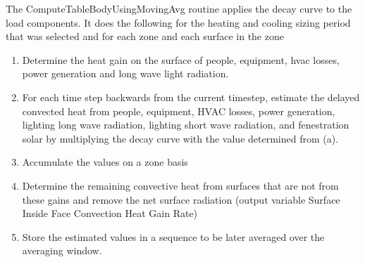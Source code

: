 The ComputeTableBodyUsingMovingAvg routine applies the decay curve to the load components. It does the following for the heating and cooling sizing period that was selected and for each zone and each surface in the zone

\begin{enumerate}
\def\labelenumi{\alph{enumi}.}
\item
  Determine the heat gain on the surface of people, equipment, hvac losses, power generation and long wave light radiation.
\item
  For each time step backwards from the current timestep, estimate the delayed convected heat from people, equipment, HVAC losses, power generation, lighting long wave radiation, lighting short wave radiation, and fenestration solar by multiplying the decay curve with the value determined from (a).
\item
  Accumulate the values on a zone basis
\item
  Determine the remaining convective heat from surfaces that are not from these gains and remove the net surface radiation (output variable Surface Inside Face Convection Heat Gain Rate)
\item
  Store the estimated values in a sequence to be later averaged over the averaging window.
\end{enumerate}
